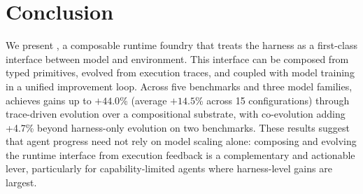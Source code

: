\section{Conclusion}
\label{sec:conclusion}


We present \ProjectName, a composable runtime foundry that treats the harness as a first-class interface between model and environment. This interface can be composed from typed primitives, evolved from execution traces, and coupled with model training in a unified improvement loop. Across five benchmarks and three model families, \ProjectName achieves gains up to $+44.0$\% (average $+14.5$\% across 15 configurations) through trace-driven evolution over a compositional substrate, with co-evolution adding +4.7\% beyond harness-only evolution on two benchmarks. These results suggest that agent progress need not rely on model scaling alone: composing and evolving the runtime interface from execution feedback is a complementary and actionable lever, particularly for capability-limited agents where harness-level gains are largest.